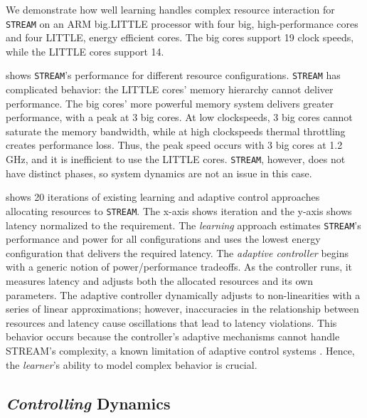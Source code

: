 We demonstrate how well learning handles complex resource interaction
for \texttt{STREAM} on an ARM big.LITTLE processor with four big,
high-performance cores and four LITTLE, energy efficient cores.  The
big cores support 19 clock speeds, while the LITTLE cores support 14.


 shows \texttt{STREAM}'s performance for
different resource configurations.  \texttt{STREAM} has complicated
behavior: the LITTLE cores' memory hierarchy cannot deliver
performance.  The big cores' more powerful memory system delivers
greater performance, with a peak at 3 big cores.  At low clockspeeds,
3 big cores cannot saturate the memory bandwidth, while at high
clockspeeds thermal throttling creates performance loss.  Thus, the
peak speed occurs with 3 big cores at 1.2 GHz, and it is inefficient
to use the LITTLE cores.  \texttt{STREAM}, however, does not have
distinct phases, so system dynamics are not an issue in this case.


 shows 20 iterations of existing learning
\cite{LEO} and adaptive control \cite{POET} approaches allocating
resources to \texttt{STREAM}.  The x-axis shows iteration and the
y-axis shows latency normalized to the requirement.  The
\emph{learning} approach estimates \texttt{STREAM}'s performance and
power for all configurations and uses the lowest energy configuration
that delivers the required latency.  The \emph{adaptive
  controller} begins with a generic notion of power/performance
tradeoffs.  As the controller runs, it measures latency and
adjusts both the allocated resources and its own parameters.  The
adaptive controller dynamically adjusts to non-linearities with a
series of linear approximations; however, inaccuracies in the
relationship between resources and latency cause oscillations that
lead to latency violations.  This behavior occurs because the
controller's adaptive mechanisms cannot handle STREAM's complexity, a
known limitation of adaptive control systems
\cite{ControlWare,POET,ICSE2014}.  Hence, the \emph{learner}'s ability
to model complex behavior is crucial.

\subsection{\emph{Controlling} Dynamics}
\label{sec:mov-control}


